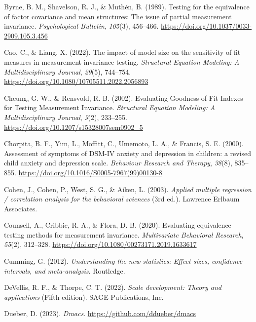 \documentclass[
  man]{apa7}
\newlength{\cslhangindent}
\newlength{\cslentryspacingunit} %
\newenvironment{CSLReferences}[2] %
 {%
  \setlength{\parindent}{0pt}
  \ifodd #1
  \let\oldpar\par
  \def\par{\hangindent=\cslhangindent\oldpar}
  \fi
  \setlength{\parskip}{#2\cslentryspacingunit}
 }%
 {}
\begin{document}
\begin{CSLReferences}{1}{0}
\leavevmode{}%
Byrne, B. M., Shavelson, R. J., \& Muthén, B. (1989). Testing for the equivalence of factor covariance and mean structures: The issue of partial measurement invariance. \emph{Psychological Bulletin}, \emph{105}(3), 456--466. \url{https://doi.org/10.1037/0033-2909.105.3.456}

\leavevmode{}%
Cao, C., \& Liang, X. (2022). The impact of model size on the sensitivity of fit measures in measurement invariance testing. \emph{Structural Equation Modeling: A Multidisciplinary Journal}, \emph{29}(5), 744--754. \url{https://doi.org/10.1080/10705511.2022.2056893}

\leavevmode{}%
Cheung, G. W., \& Rensvold, R. B. (2002). Evaluating Goodness-of-Fit Indexes for Testing Measurement Invariance. \emph{Structural Equation Modeling: A Multidisciplinary Journal}, \emph{9}(2), 233--255. \url{https://doi.org/10.1207/s15328007sem0902_5}

\leavevmode{}%
Chorpita, B. F., Yim, L., Moffitt, C., Umemoto, L. A., \& Francis, S. E. (2000). Assessment of symptoms of DSM-IV anxiety and depression in children: a revised child anxiety and depression scale. \emph{Behaviour Research and Therapy}, \emph{38}(8), 835--855. \url{https://doi.org/10.1016/S0005-7967(99)00130-8}

\leavevmode{}%
Cohen, J., Cohen, P., West, S. G., \& Aiken, L. (2003). \emph{Applied multiple regression / correlation analysis for the behavioral sciences} (3rd ed.). Lawrence Erlbaum Associates.

\leavevmode{}%
Counsell, A., Cribbie, R. A., \& Flora, D. B. (2020). Evaluating equivalence testing methods for measurement invariance. \emph{Multivariate Behavioral Research}, \emph{55}(2), 312--328. \url{https://doi.org/10.1080/00273171.2019.1633617}

\leavevmode{}%
Cumming, G. (2012). \emph{Understanding the new statistics: Effect sizes, confidence intervals, and meta-analysis}. Routledge.

\leavevmode{}%
DeVellis, R. F., \& Thorpe, C. T. (2022). \emph{Scale development: Theory and applications} (Fifth edition). SAGE Publications, Inc.

\leavevmode{}%
Dueber, D. (2023). \emph{Dmacs}. \url{https://github.com/ddueber/dmacs}


\end{CSLReferences}
\end{document}
